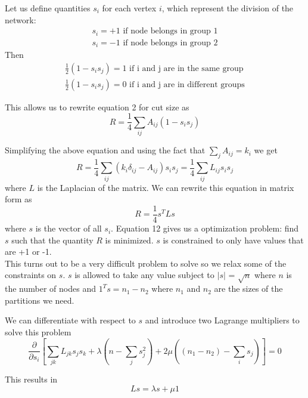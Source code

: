 \documentclass[12pt]{article}
\begin{document}
	Let us define quantities $s_i$ for each vertex $i$, which represent the division of the network: 
	\begin{align}
		s_i = +1 \text{ if node belongs in group 1} \\
		s_i = -1 \text{ if node belongs in group 2}
	\end{align}
	Then
	\begin{align}
		\frac{1}{2} (1 - s_i s_j) = 1 \text{ if i and j are in the same group} \\
		\frac{1}{2} (1 - s_i s_j) = 0 \text{ if i and j are in different groups}
	\end{align}
	
	This allows us to rewrite equation 2 for cut size as
	\begin{equation}
		R = \frac{1}{4} \sum_{ij} A_{ij} (1- s_i s_j)
	\end{equation}
	
	Simplifying the above equation and using the fact that $\sum_j A_{ij} = k_i$ we get
	\begin{equation}
		R = \frac{1}{4} \sum_{ij} (k_i \delta_{ij} - A_{ij}) s_i s_j = \frac{1}{4} \sum_{ij} L_{ij} s_i s_j
	\end{equation}
	where $L$ is the Laplacian of the matrix. We can rewrite this equation in matrix form as 
	\begin{equation}
		R = \frac{1}{4} s^T L s
	\end{equation}
	where $s$ is the vector of all $s_i$. Equation 12 gives us a optimization problem: find $s$ such that the quantity $R$ is minimized. $s$ is constrained to only have values that are +1 or -1. \\
	
	This turns out to be a very difficult problem to solve so we relax some of the constraints on $s$. $s$ is allowed to take any value subject to $|s|$ = $\sqrt{n}$ where $n$ is the number of nodes and $1^T s = n_1 - n_2 $ where $n_1$ and $n_2$ are the sizes of the partitions we need. 
	
	We can differentiate with respect to $s$ and introduce two Lagrange multipliers to solve this problem
	\begin{equation}
		\frac{\partial}{\partial s_i} 
			\left[ 
			\sum_{jk} L_{jk} s_j s_k 
			+ \lambda \left( n - \sum_j s_j^2 \right)
			+ 2 \mu \left( (n_1 - n_2) - \sum_i s_j \right)
			\right] = 0 
	\end{equation}
	
	This results in
	\begin{equation}
		L s = \lambda s + \mu 1 
	\end{equation} \\
	
\end{document}
